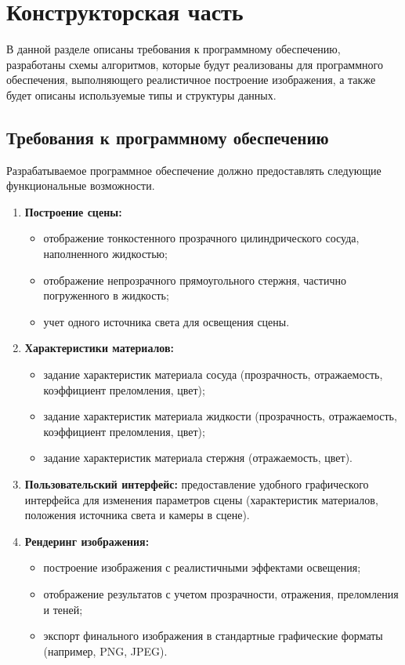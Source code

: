 \section{Конструкторская часть}

В данной разделе описаны требования к программному обеспечению, разработаны схемы алгоритмов, которые будут реализованы для программного обеспечения, выполняющего реалистичное построение изображения, а также будет описаны используемые типы и структуры данных.

\subsection{Требования к программному обеспечению}

Разрабатываемое программное обеспечение должно предоставлять следующие функциональные возможности.

\begin{enumerate}[label=\arabic*.]
	\item \textbf{Построение сцены:}
	\begin{itemize}
		\item отображение тонкостенного прозрачного цилиндрического сосуда, наполненного жидкостью;
		\item отображение непрозрачного прямоугольного стержня, частично погруженного в жидкость;
		\item учет одного источника света для освещения сцены.
	\end{itemize}
	
	\item \textbf{Характеристики материалов:}
	\begin{itemize}
		\item задание характеристик материала сосуда (прозрачность, отражаемость, коэффициент преломления, цвет);
		\item задание характеристик материала жидкости (прозрачность, отражаемость, коэффициент преломления, цвет);
		\item задание характеристик материала стержня (отражаемость, цвет).
	\end{itemize}
	
	\item \textbf{Пользовательский интерфейс:} предоставление удобного графического интерфейса для изменения параметров сцены (характеристик материалов, положения источника света и камеры в сцене).
	
	\item \textbf{Рендеринг изображения:}
	\begin{itemize}
		\item построение изображения с реалистичными эффектами освещения;
		\item отображение результатов с учетом прозрачности, отражения, преломления и теней;
		\item экспорт финального изображения в стандартные графические форматы (например, PNG, JPEG).
	\end{itemize}
\end{enumerate}

